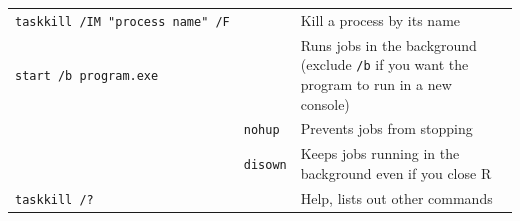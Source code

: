 \documentclass[]{book}
\begin{document}
\begin{longtable}[]{@{}lll@{}}
\begin{minipage}[t]{0.23\columnwidth}\raggedright
\texttt{taskkill\ /IM\ "process\ name"\ /F}\strut
\end{minipage} & \begin{minipage}[t]{0.34\columnwidth}\raggedright
\strut
\end{minipage} & \begin{minipage}[t]{0.34\columnwidth}\raggedright
Kill a process by its name\strut
\end{minipage}\tabularnewline
\begin{minipage}[t]{0.23\columnwidth}\raggedright
\texttt{start\ /b\ program.exe}\strut
\end{minipage} & \begin{minipage}[t]{0.34\columnwidth}\raggedright
\strut
\end{minipage} & \begin{minipage}[t]{0.34\columnwidth}\raggedright
Runs jobs in the background (exclude \texttt{/b} if you want the program to run in a new console)\strut
\end{minipage}\tabularnewline
\begin{minipage}[t]{0.23\columnwidth}\raggedright
\strut
\end{minipage} & \begin{minipage}[t]{0.34\columnwidth}\raggedright
\texttt{nohup}\strut
\end{minipage} & \begin{minipage}[t]{0.34\columnwidth}\raggedright
Prevents jobs from stopping\strut
\end{minipage}\tabularnewline
\begin{minipage}[t]{0.23\columnwidth}\raggedright
\strut
\end{minipage} & \begin{minipage}[t]{0.34\columnwidth}\raggedright
\texttt{disown}\strut
\end{minipage} & \begin{minipage}[t]{0.34\columnwidth}\raggedright
Keeps jobs running in the background even if you close R\strut
\end{minipage}\tabularnewline
\begin{minipage}[t]{0.23\columnwidth}\raggedright
\texttt{taskkill\ /?}\strut
\end{minipage} & \begin{minipage}[t]{0.34\columnwidth}\raggedright
\strut
\end{minipage} & \begin{minipage}[t]{0.34\columnwidth}\raggedright
Help, lists out other commands\strut
\end{minipage}\tabularnewline
\bottomrule
\end{longtable}
\end{document}
